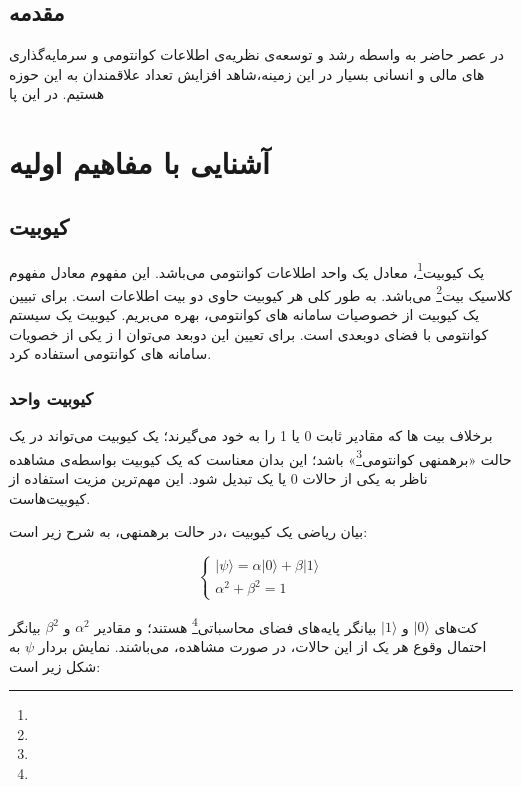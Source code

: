 \documentclass{book}
\begin{document}
\tableofcontents
\newpage
\section*{مقدمه}	
در عصر حاضر به‌ واسطه رشد و توسعه‌ی نظریه‌ی اطلاعات کوانتومی و سرمایه‌گذاری های مالی و انسانی بسیار در این زمینه،‌شاهد افزایش تعداد علاقمندان به این حوزه هستیم. در این پا
\newpage
\chapter{آشنایی با مفاهیم اولیه}
\section{کیوبیت}

یک کیوبیت\footnote{}، معادل یک واحد اطلاعات کوانتومی می‌باشد. این مفهوم معادل مفهوم کلاسیک بیت\footnote{} می‌باشد. به طور کلی هر کیوبیت حاوی دو بیت اطلاعات است. برای تبیین یک کیوبیت از خصوصیات سامانه های کوانتومی، بهره‌ می‌بریم. کیوبیت یک سیستم کوانتومی با فضای دوبعدی است. برای تعیین این دوبعد می‌توان ا ز یکی از خصویات سامانه های کوانتومی استفاده کرد. 
\subsection{کیوبیت‌ واحد}
برخلاف بیت ها که مقادیر ثابت 0 یا 1 را به خود می‌گیرند؛ یک کیوبیت می‌تواند در یک حالت «برهمنهی کوانتومی\footnote{}» باشد؛ این بدان معناست که یک کیوبیت بواسطه‌ی مشاهده ناظر به یکی از حالات 0 یا یک تبدیل شود. این مهم‌ترین مزیت استفاده از کیوبیت‌هاست. 

\pagebreak

بیان ریاضی یک کیوبیت ،در حالت برهمنهی، به شرح زیر است:
\vspace{0.5cm}

\begin{equation}\label{psi ket}
	\left\{
	\begin{array}{ll}
		\vert \psi \rangle = \alpha\vert 0 \rangle + \beta\vert 1 \rangle \\
		\alpha^2 + \beta^2 = 1
	\end{array}
	\right.
\end{equation}

کت‌های $\vert 0 \rangle$ و $\vert 1 \rangle$ بیانگر پایه‌های فضای محاسباتی\footnote{} هستند؛ و مقادیر $\alpha^2$ و $\beta^2$ بیانگر احتمال وقوع هر یک از این حالات، در صورت مشاهده، می‌باشند. نمایش بردار $\psi$ به شکل زیر است:
\begin{center}
\end{center}
\end{document}
